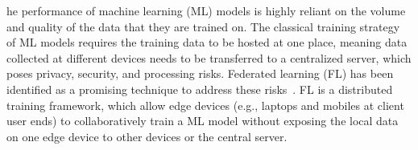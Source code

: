 \documentclass[10pt,journal,compsoc]{IEEEtran}
\begin{document}
\maketitle


\IEEEdisplaynontitleabstractindextext



%
\IEEEpeerreviewmaketitle



he performance of machine learning (ML) models is highly reliant on the volume and quality of the data that they are trained on. The classical training strategy of ML models requires the training data to be hosted at one place, meaning data collected at different devices needs to be transferred to a centralized server, which poses privacy, security, and processing risks. Federated learning (FL) has been identified as a promising technique to address these risks~\cite{mcmahan2017communication}\cite{yin2021comprehensive}. FL is a distributed training framework, which allow edge devices (e.g., laptops and mobiles at client user ends) to collaboratively train a ML model without exposing the local data on one edge device to other devices or the central server. 
\end{document}
